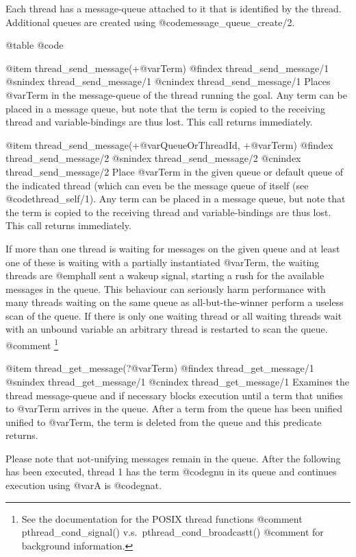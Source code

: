 Each thread has a message-queue attached to it that is identified
by the thread. Additional queues are created using
@code{message_queue_create/2}.

@table @code

@item thread_send_message(+@var{Term})
@findex thread_send_message/1
@snindex thread_send_message/1
@cnindex thread_send_message/1
Places @var{Term} in the message-queue of the thread running the goal. 
Any term can be placed in a message queue, but note that the term is 
copied to the receiving thread and variable-bindings are thus lost. 
This call returns immediately.

@item thread_send_message(+@var{QueueOrThreadId}, +@var{Term})
@findex thread_send_message/2
@snindex thread_send_message/2
@cnindex thread_send_message/2
Place @var{Term} in the given queue or default queue of the indicated
thread (which can even be the message queue of itself (see
@code{thread_self/1}). Any term can be placed in a message queue, but note that
the term is copied to the receiving thread and variable-bindings are
thus lost. This call returns immediately.

If more than one thread is waiting for messages on the given queue and
at least one of these is waiting with a partially instantiated
@var{Term}, the waiting threads are @emph{all} sent a wakeup signal,
starting a rush for the available messages in the queue.  This behaviour
can seriously harm performance with many threads waiting on the same
queue as all-but-the-winner perform a useless scan of the queue. If
there is only one waiting thread or all waiting threads wait with an
unbound variable an arbitrary thread is restarted to scan the queue.
@comment    \footnote{See the documentation for the POSIX thread functions
@comment          pthread_cond_signal() v.s.\ pthread_cond_broadcastt()
@comment          for background information.}

@item thread_get_message(?@var{Term})
@findex thread_get_message/1
@snindex thread_get_message/1
@cnindex thread_get_message/1
Examines the thread message-queue and if necessary blocks execution
until a term that unifies to @var{Term} arrives in the queue.  After
a term from the queue has been unified unified to @var{Term}, the
term is deleted from the queue and this predicate returns.

Please note that not-unifying messages remain in the queue.  After
the following has been executed, thread 1 has the term @code{gnu}
in its queue and continues execution using @var{A} is @code{gnat}.

